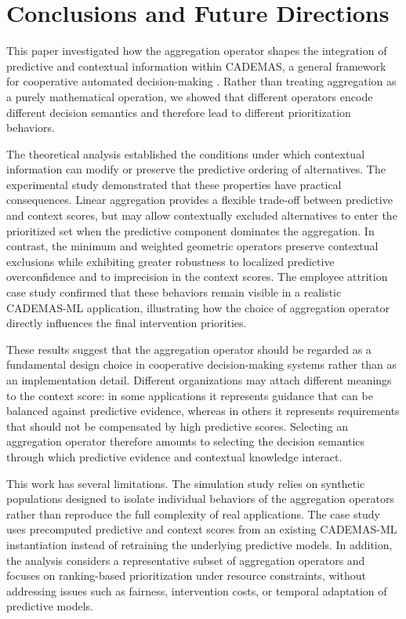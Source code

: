 \documentclass[mathematics,article,submit,moreauthors]{Definitions/mdpi}
\begin{document}
\section{Conclusions and Future Directions}\label{sect:conclusions}

This paper investigated how the aggregation operator shapes the integration of predictive and contextual information within CADEMAS, a general framework for cooperative automated decision-making \citep{NovoaHernandez2026}. Rather than treating aggregation as a purely mathematical operation, we showed that different operators encode different decision semantics and therefore lead to different prioritization behaviors.

The theoretical analysis established the conditions under which contextual information can modify or preserve the predictive ordering of alternatives. The experimental study demonstrated that these properties have practical consequences. Linear aggregation provides a flexible trade-off between predictive and context scores, but may allow contextually excluded alternatives to enter the prioritized set when the predictive component dominates the aggregation. In contrast, the minimum and weighted geometric operators preserve contextual exclusions while exhibiting greater robustness to localized predictive overconfidence and to imprecision in the context scores. The employee attrition case study confirmed that these behaviors remain visible in a realistic CADEMAS-ML application, illustrating how the choice of aggregation operator directly influences the final intervention priorities.

These results suggest that the aggregation operator should be regarded as a fundamental design choice in cooperative decision-making systems rather than as an implementation detail. Different organizations may attach different meanings to the context score: in some applications it represents guidance that can be balanced against predictive evidence, whereas in others it represents requirements that should not be compensated by high predictive scores. Selecting an aggregation operator therefore amounts to selecting the decision semantics through which predictive evidence and contextual knowledge interact.

This work has several limitations. The simulation study relies on synthetic populations designed to isolate individual behaviors of the aggregation operators rather than reproduce the full complexity of real applications. The case study uses precomputed predictive and context scores from an existing CADEMAS-ML instantiation instead of retraining the underlying predictive models. In addition, the analysis considers a representative subset of aggregation operators and focuses on ranking-based prioritization under resource constraints, without addressing issues such as fairness, intervention costs, or temporal adaptation of predictive models.
\end{document}

